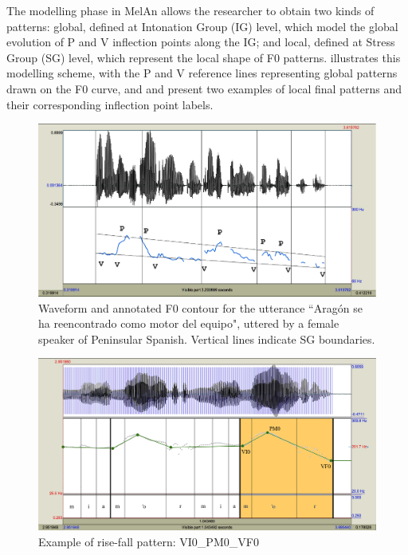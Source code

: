 \documentclass[output=paper]{langsci/langscibook}
\begin{document}
The modelling phase in MelAn allows the researcher to obtain two kinds of patterns: global, defined at Intonation Group (IG) level, which model the global evolution of P and V inflection points along the IG; and local, defined at Stress Group (SG) level, which represent the local shape of F0 patterns.  illustrates this modelling scheme, with the P and V reference lines representing global patterns drawn on the F0 curve, and  and  present two examples of local final patterns and their corresponding inflection point labels.

  
\begin{figure}
\includegraphics[width=\textwidth]{figures/GAR-img008.png}
\caption{Waveform and annotated F0 contour for the utterance ``Aragón se ha reencontrado como motor del equipo", uttered by a female speaker of Peninsular Spanish. Vertical lines indicate SG boundaries.}
\label{fig:gar:8}
\end{figure}

\begin{figure}
\includegraphics[width=\textwidth]{figures/GAR-img009.png}
\caption{Example of rise-fall pattern: VI0\_PM0\_VF0 \citep{Garrido2012enton}}
\label{fig:gar:9}
\end{figure}
\end{document}

